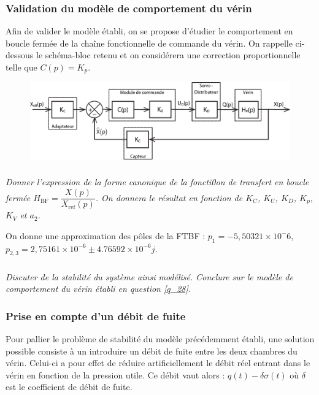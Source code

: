 \documentclass[10pt,fleqn]{article} %
\begin{document}
\subsubsection{Validation du modèle de comportement du vérin}

Afin de valider le modèle établi, on se propose d'étudier le comportement en boucle fermée de la chaîne fonctionnelle de commande du vérin. On rappelle ci-dessous le schéma-bloc retenu et on considérera une correction proportionnelle telle que  $C(p)=K_p$.

\begin{figure}[H]
\centering
\includegraphics[width=\linewidth]{img_08}
\end{figure}

\subparagraph{}\textit{Donner l'expression de la forme canonique de la foncti0on de transfert en boucle fermée $H_{\text{BF}}=\dfrac{X(p)}{X_{\text{ref}}(p)}$. On donnera le résultat en fonction de $K_C$, $K_U$, $K_D$, $K_p$, $K_V$ et $a_2$. }


\vspace{.5cm}
On donne une approximation des pôles de la FTBF : $p_1 = -5,50321\times 10^-6$, $p_{2,3} = 2,75161\times 10^{-6} \pm 4.76592\times 10^{-6} j$.

\subparagraph{}\textit{Discuter de la stabilité du système ainsi modélisé. Conclure sur le modèle de comportement du vérin établi en question \ref{q_28}.}

\subsubsection{Prise en compte d'un débit de fuite}

Pour pallier le problème de stabilité du modèle précédemment établi, une solution possible consiste à un introduire un débit de fuite entre les deux chambres du vérin. Celui-ci a pour effet de réduire artificiellement le débit réel entrant dans le vérin en fonction de la pression utile. Ce débit vaut alors : $q(t)-\delta \sigma(t)$  où $\delta$ est le coefficient de débit de fuite.
\end{document}

